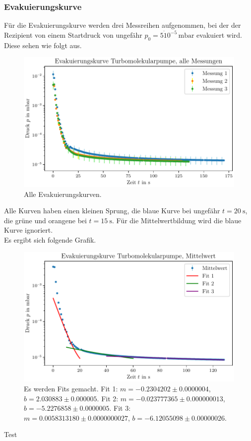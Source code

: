 \subsubsection{Evakuierungskurve}
Für die Evakuierungskurve werden drei Messreihen aufgenommen, bei der der Rezipient von einem Startdruck von ungefähr $p_0 = \num{5} \dot 10^{-5} \, \si{\milli\bar}$ evakuiert wird.
Diese sehen wie folgt aus.

\begin{figure}[H]
    \centering
    \includegraphics[width=\textwidth]{plots/TP_Evakuierungskurve_alle.pdf}
    \caption{Alle Evakuierungskurven.}
    \label{fig:TP_evak_alle}
\end{figure}

Alle Kurven haben einen kleinen Sprung, die blaue Kurve bei ungefähr $t = \SI{20}{\second}$, die grüne und orangene bei $t = \SI{15}{\second}$.
Für die Mittelwertbildung wird die blaue Kurve ignoriert. \\
Es ergibt sich folgende Grafik.

\begin{figure}[H]
    \centering
    \includegraphics[width=\textwidth]{plots/TP_Evakuierungskurve.pdf}
    \caption{Es werden Fits gemacht. Fit 1: $m = \num{-0.2304202} \pm \num{0.0000004}$, $b = \num{2.030883} \pm \num{0.000005}$. Fit 2: $m = \num{-0.023777365} \pm \num{0.000000013}$, $b = \num{-5.2276858} \pm \num{0.0000005}$. Fit 3: $m = \num{0.0058313180} \pm \num{0.0000000027}$, $b = \num{-6.12055098} \pm \num{0.00000026}$.}
    \label{fig:TP_evak}
\end{figure}

Test \cite{grundlagen_vakuumtechnik}